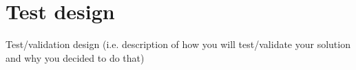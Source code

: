 \section{Test design}
Test/validation design (i.e. description of how you will 
test/validate your solution and why you decided to do that)